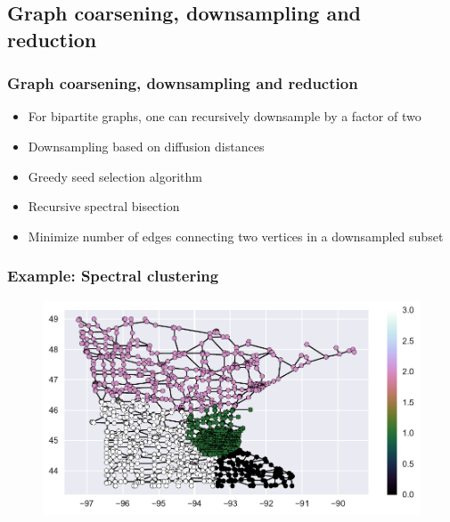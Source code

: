 \documentclass{beamer}
\begin{document}
\subsection{Graph coarsening, downsampling and reduction}

\begin{frame}
  \frametitle{Graph coarsening, downsampling and reduction}

  \begin{itemize}
  \item For bipartite graphs, one can recursively downsample by a factor of two
  \item Downsampling based on diffusion distances
  \item Greedy seed selection algorithm
  \item Recursive spectral bisection
  \item Minimize number of edges connecting two vertices in a downsampled subset
  \end{itemize}
\end{frame}

\begin{frame}
  \frametitle{Example: Spectral clustering}
\begin{figure}
\includegraphics[trim={1cm 0.7cm 2cm 0},clip,width=0.9\linewidth]{../img/clustering_methods_1.pdf}
\end{figure}
\end{frame}
\end{document}
